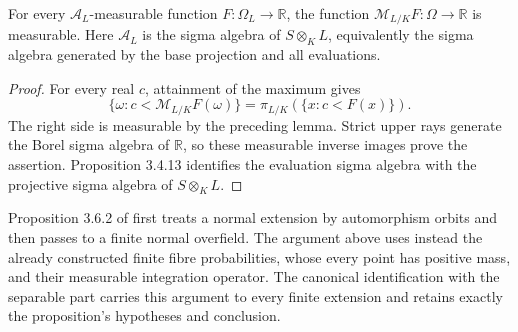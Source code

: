 \begin{proposition}
\label{prop:fibre-maximum-measurable}
\leanok
{}
For every $\mathcal A_L$-measurable function $F:\Omega_L\to\mathbb R$,
the function $\mathcal M_{L/K}F:\Omega\to\mathbb R$ is measurable.
Here $\mathcal A_L$ is the sigma algebra of $S\otimes_K L$, equivalently
the sigma algebra generated by the base projection and all evaluations.
\end{proposition}
\begin{proof}
For every real $c$, attainment of the maximum gives
\[
 \{\omega:c<\mathcal M_{L/K}F(\omega)\}
 =\pi_{L/K}(\{x:c<F(x)\}).
\]
The right side is measurable by the preceding lemma. Strict upper
rays generate the Borel sigma algebra of $\mathbb R$, so these
measurable inverse images prove the assertion. Proposition 3.4.13
identifies the evaluation sigma algebra with the projective sigma
algebra of $S\otimes_K L$.
\end{proof}

\begin{remark}
Proposition 3.6.2 of \cite{chen-moriwaki} first treats a normal extension
by automorphism orbits and then passes to a finite normal overfield.
The argument above uses instead the already constructed finite fibre
probabilities, whose every point has positive mass, and their
measurable integration operator. The canonical identification with the
separable part carries this argument to every finite extension and
retains exactly the proposition's hypotheses and conclusion.
\end{remark}
